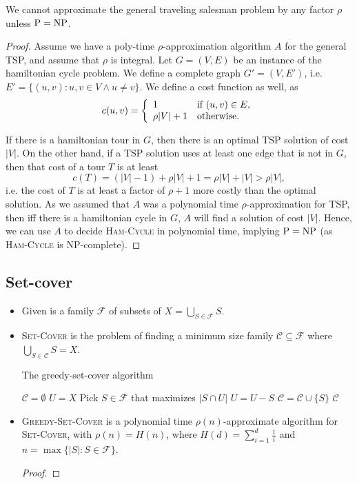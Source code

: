 We cannot approximate the general traveling salesman problem by any
factor $\rho$ unless $\mathop{\text{P}}=\mathop{\text{NP}}$.
\begin{proof}
  Assume we have a poly-time $\rho$-approximation algorithm $A$ for
  the general TSP, and assume that $\rho$ is integral. Let $G=(V,E)$
  be an instance of the hamiltonian cycle problem. We define a
  complete graph $G'=(V,E')$, i.e. $E' = \{(u,v) : u,v \in V \land u
  \not= v\}$. We define a cost function as well, as
  $$c(u,v) = \left\{\begin{array}{l l}
      1 & \text{if $(u,v) \in E$}, \\
      \rho |V| + 1 & \text{otherwise}.
    \end{array}\right.
  $$

  If there is a hamiltonian tour in $G$, then there is an optimal TSP
  solution of cost $|V|$. On the other hand, if a TSP solution uses at
  least one edge that is not in $G$, then that cost of a tour $T$ is
  at least
  $$
    c(T) = (|V| - 1) + \rho|V| + 1 = \rho|V| + |V| > \rho|V|,
  $$
  i.e. the cost of $T$ is at least a factor of $\rho + 1$ more costly
  than the optimal solution. As we assumed that $A$ was a polynomial
  time $\rho$-approximation for TSP, then iff there is a hamiltonian
  cycle in $G$, $A$ will find a solution of cost $|V|$. Hence, we can
  use $A$ to decide \textsc{Ham-Cycle} in polynomial time, implying
  $\mathop{\text{P}} = \mathop{\text{NP}}$ (as \textsc{Ham-Cycle} is NP-complete).
\end{proof}

\subsection{Set-cover}

\begin{itemize}
\item Given is a family $\mathcal{F}$ of subsets of $X = \bigcup_{S
    \in \mathcal{F}} S$.
\item \textsc{Set-Cover} is the problem of finding a minimum size
  family $\mathcal{C} \subseteq \mathcal{F}$ where $\bigcup_{S \in
    \mathcal{C}} S = X$.
\begin{algorithm}
\caption{The greedy-set-cover algorithm}
\begin{algorithmic}[1]
  \State $\mathcal{C} = \emptyset$
  \State $U = X$
    \State Pick $S \in \mathcal{F}$ that maximizes $|S \cap U|$
    \State $U = U - S$
    \State $\mathcal{C} = \mathcal{C} \cup \{S\}$
  \EndWhile
  \State \Return $\mathcal{C}$
\EndProcedure
\end{algorithmic}
\end{algorithm}
\item \textsc{Greedy-Set-Cover} is a polynomial time
  $\rho(n)$-approximate algorithm for \textsc{Set-Cover}, with
  $\rho(n) = H(n)$, where $H(d) = \sum_{i=1}^d \frac{1}{i}$ and $n =
  \max \{|S| : S \in \mathcal{F} \}$.
  \begin{proof}
  \end{proof}
\end{itemize}

